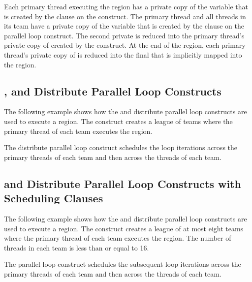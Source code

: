 Each primary thread executing the  region has a private copy of the 
variable  that is created by the  clause on the  construct. 
The primary thread and all threads in its team have a private copy of the variable 
 that is created by the  clause on the parallel loop construct. 
The second private  is reduced into the primary thread's private copy of  
created by the  construct. At the end of the  region, 
each primary thread's private copy of  is reduced into the final  that is 
implicitly mapped into the  region.



\subsection{ , and Distribute Parallel Loop Constructs}
\label{subsec:teams_distribute_parallel}

The following example shows how the   and distribute 
parallel loop constructs are used to execute a  region. The  
 construct creates a league of teams where the primary thread of each 
team executes the  region.

The distribute parallel loop construct schedules the loop iterations across the 
primary threads of each team and then across the threads of each team.



\subsection{  and Distribute Parallel Loop 
Constructs with Scheduling Clauses}
\label{subsec:teams_distribute_parallel_schedule}

The following example shows how the   and distribute 
parallel loop constructs are used to execute a  region. The  
construct creates a league of at most eight teams where the primary thread of each 
team executes the  region. The number of threads in each team is 
less than or equal to 16.

The  parallel loop construct schedules the subsequent loop iterations 
across the primary threads of each team and then across the threads of each team.

